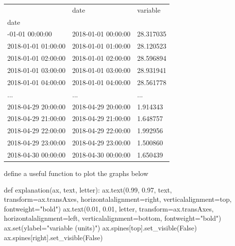 \documentclass[
  letterpaper,
  DIV=11,
  numbers=noendperiod,
  oneside]{scrreprt}
\newenvironment{Shaded}{\begin{snugshade}}{\end{snugshade}}
\newcommand{\BuiltInTok}[1]{\textcolor[rgb]{0.00,0.23,0.31}{#1}}
\newcommand{\FloatTok}[1]{\textcolor[rgb]{0.68,0.00,0.00}{#1}}
\newcommand{\KeywordTok}[1]{\textcolor[rgb]{0.00,0.23,0.31}{#1}}
\newcommand{\NormalTok}[1]{\textcolor[rgb]{0.00,0.23,0.31}{#1}}
\newcommand{\OperatorTok}[1]{\textcolor[rgb]{0.37,0.37,0.37}{#1}}
\newcommand{\StringTok}[1]{\textcolor[rgb]{0.13,0.47,0.30}{#1}}
\newcommand{\VariableTok}[1]{\textcolor[rgb]{0.07,0.07,0.07}{#1}}
\begin{document}
\begin{longtable}[]{@{}lll@{}}
\toprule\noalign{}
& date & variable \\
date & & \\
\midrule\noalign{}
\endhead
\bottomrule\noalign{}
\endlastfoot
2018-01-01 00:00:00 & 2018-01-01 00:00:00 & 28.317035 \\
2018-01-01 01:00:00 & 2018-01-01 01:00:00 & 28.120523 \\
2018-01-01 02:00:00 & 2018-01-01 02:00:00 & 28.596894 \\
2018-01-01 03:00:00 & 2018-01-01 03:00:00 & 28.931941 \\
2018-01-01 04:00:00 & 2018-01-01 04:00:00 & 28.561778 \\
... & ... & ... \\
2018-04-29 20:00:00 & 2018-04-29 20:00:00 & 1.914343 \\
2018-04-29 21:00:00 & 2018-04-29 21:00:00 & 1.648757 \\
2018-04-29 22:00:00 & 2018-04-29 22:00:00 & 1.992956 \\
2018-04-29 23:00:00 & 2018-04-29 23:00:00 & 1.500860 \\
2018-04-30 00:00:00 & 2018-04-30 00:00:00 & 1.650439 \\
\end{longtable}

define a useful function to plot the graphs below

\begin{Shaded}
\begin{Highlighting}[]
\KeywordTok{def}\NormalTok{ explanation(ax, text, letter):}
\NormalTok{    ax.text(}\FloatTok{0.99}\NormalTok{, }\FloatTok{0.97}\NormalTok{, text,}
\NormalTok{            transform}\OperatorTok{=}\NormalTok{ax.transAxes,}
\NormalTok{            horizontalalignment}\OperatorTok{=}\StringTok{\textquotesingle{}right\textquotesingle{}}\NormalTok{, verticalalignment}\OperatorTok{=}\StringTok{\textquotesingle{}top\textquotesingle{}}\NormalTok{,}
\NormalTok{            fontweight}\OperatorTok{=}\StringTok{"bold"}\NormalTok{)}
\NormalTok{    ax.text(}\FloatTok{0.01}\NormalTok{, }\FloatTok{0.01}\NormalTok{, letter,}
\NormalTok{            transform}\OperatorTok{=}\NormalTok{ax.transAxes,}
\NormalTok{            horizontalalignment}\OperatorTok{=}\StringTok{\textquotesingle{}left\textquotesingle{}}\NormalTok{, verticalalignment}\OperatorTok{=}\StringTok{\textquotesingle{}bottom\textquotesingle{}}\NormalTok{,}
\NormalTok{            fontweight}\OperatorTok{=}\StringTok{"bold"}\NormalTok{)}
\NormalTok{    ax.}\BuiltInTok{set}\NormalTok{(ylabel}\OperatorTok{=}\StringTok{"variable (units)"}\NormalTok{)}
\NormalTok{    ax.spines[}\StringTok{\textquotesingle{}top\textquotesingle{}}\NormalTok{].set\_visible(}\VariableTok{False}\NormalTok{)}
\NormalTok{    ax.spines[}\StringTok{\textquotesingle{}right\textquotesingle{}}\NormalTok{].set\_visible(}\VariableTok{False}\NormalTok{)}
\end{Highlighting}
\end{Shaded}
\end{document}
